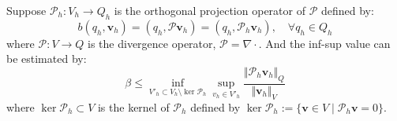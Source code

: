 \begin{thm}\label{thm1}
Suppose $\mathcal P_h:V_h \rightarrow Q_h$ is the orthogonal projection operator of $\mathcal P$ defined by:
\begin{equation}\label{Ph}
    b(q_h,\boldsymbol v_h) = (q_h, \mathcal P \boldsymbol v_h) = (q_h, \mathcal P_h \boldsymbol v_h), \quad \forall q_h \in Q_h
\end{equation}
where $\mathcal P:V\rightarrow Q$ is the divergence operator, $\mathcal P = \nabla \cdot$. And the inf-sup value can be estimated by:
\begin{equation}\label{r1}
    \beta \le \inf_{V'_h \subset V_h \setminus \ker \mathcal P_h} \sup_{v_h \in V'_h} \frac{\Vert \mathcal P_h \boldsymbol v_h \Vert_Q}{\Vert \boldsymbol v_h \Vert_V}
\end{equation}
    where $\ker \mathcal P_h \subset V$ is the kernel of $\mathcal P_h$ defined by $\ker \mathcal P_h := \{ \boldsymbol v \in V \;\vert\; \mathcal P_h \boldsymbol v = 0 \}$.
\end{thm}
